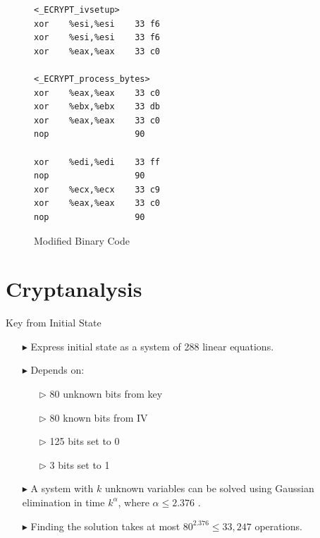 \documentclass[conference]{IEEEtran}
\begin{document}
\begin{figure}
\begin{lstlisting}[style=asm, frame=tlrb]
<_ECRYPT_ivsetup>
xor    %esi,%esi    33 f6
xor    %esi,%esi    33 f6
xor    %eax,%eax    33 c0

<_ECRYPT_process_bytes>
xor    %eax,%eax    33 c0
xor    %ebx,%ebx    33 db 
xor    %eax,%eax    33 c0
nop                 90

xor    %edi,%edi    33 ff
nop                 90
xor    %ecx,%ecx    33 c9
xor    %eax,%eax    33 c0
nop                 90
\end{lstlisting}
\caption{Modified Binary Code}
\end{figure}

\section{Cryptanalysis}

Key from Initial State
\begin{itemize}
\item[$\blacktriangleright$] Express initial state as a system of 288 linear equations.
\item[$\blacktriangleright$] Depends on:
\begin{itemize}
\item[$\triangleright$] 80 unknown bits from key
\item[$\triangleright$] 80 known bits from IV
\item[$\triangleright$] 125 bits set to 0
\item[$\triangleright$] 3 bits set to 1
\end{itemize}
\item[$\blacktriangleright$] A system with $k$ unknown variables can be solved using Gaussian elimination in time $k^\alpha$, where $\alpha\leq 2.376$ \cite{gauss}.
\item[$\blacktriangleright$] Finding the solution takes at most $80^{2.376} \leq 33,247$ operations.
\end{itemize}
\end{document}

